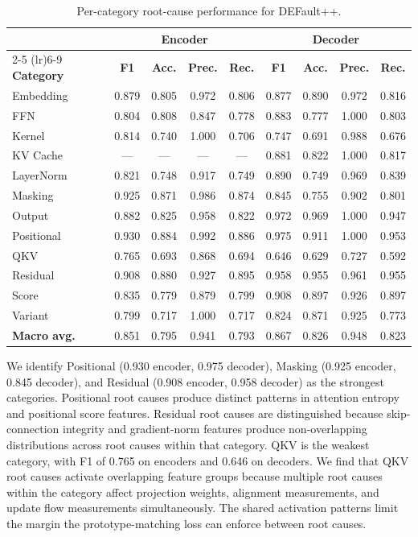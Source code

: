 \begin{table}[!htbp]
\centering
\caption{Per-category root-cause performance for DEFault++.}
\label{tab:perf_level3_category}
\small
\begin{tabular}{l c c c c c c c c}
\toprule
& \multicolumn{4}{c}{\textbf{Encoder}} & \multicolumn{4}{c}{\textbf{Decoder}} \\
\cmidrule(lr){2-5} \cmidrule(lr){6-9}
\textbf{Category} & \textbf{F1} & \textbf{Acc.} & \textbf{Prec.} & \textbf{Rec.} & \textbf{F1} & \textbf{Acc.} & \textbf{Prec.} & \textbf{Rec.} \\
\midrule
Embedding & 0.879 & 0.805 & 0.972 & 0.806 & 0.877 & 0.890 & 0.972 & 0.816 \\
FFN & 0.804 & 0.808 & 0.847 & 0.778 & 0.883 & 0.777 & 1.000 & 0.803 \\
Kernel & 0.814 & 0.740 & 1.000 & 0.706 & 0.747 & 0.691 & 0.988 & 0.676 \\
KV Cache & --- & --- & --- & --- & 0.881 & 0.822 & 1.000 & 0.817 \\
LayerNorm & 0.821 & 0.748 & 0.917 & 0.749 & 0.890 & 0.749 & 0.969 & 0.839 \\
Masking & 0.925 & 0.871 & 0.986 & 0.874 & 0.845 & 0.755 & 0.902 & 0.801 \\
Output & 0.882 & 0.825 & 0.958 & 0.822 & 0.972 & 0.969 & 1.000 & 0.947 \\
Positional & 0.930 & 0.884 & 0.992 & 0.886 & 0.975 & 0.911 & 1.000 & 0.953 \\
QKV & 0.765 & 0.693 & 0.868 & 0.694 & 0.646 & 0.629 & 0.727 & 0.592 \\
Residual & 0.908 & 0.880 & 0.927 & 0.895 & 0.958 & 0.955 & 0.961 & 0.955 \\
Score & 0.835 & 0.779 & 0.879 & 0.799 & 0.908 & 0.897 & 0.926 & 0.897 \\
Variant & 0.799 & 0.717 & 1.000 & 0.717 & 0.824 & 0.871 & 0.925 & 0.773 \\
\midrule
\textbf{Macro avg.} & 0.851 & 0.795 & 0.941 & 0.793 & 0.867 & 0.826 & 0.948 & 0.823 \\
\bottomrule
\end{tabular}
\end{table}

We identify Positional (0.930 encoder, 0.975 decoder), Masking (0.925 encoder, 0.845 decoder), and Residual (0.908 encoder, 0.958 decoder) as the strongest categories. Positional root causes produce distinct patterns in attention entropy and positional score features. Residual root causes are distinguished because skip-connection integrity and gradient-norm features produce non-overlapping distributions across root causes within that category. QKV is the weakest category, with F1 of 0.765 on encoders and 0.646 on decoders. We find that QKV root causes activate overlapping feature groups because multiple root causes within the category affect projection weights, alignment measurements, and update flow measurements simultaneously. The shared activation patterns limit the margin the prototype-matching loss can enforce between root causes.

